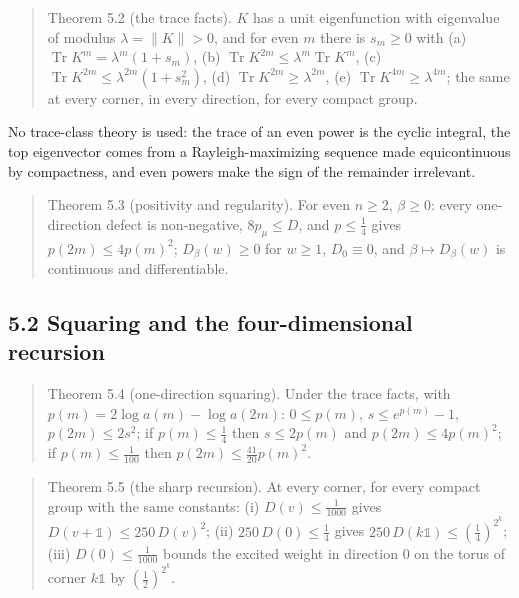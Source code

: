 \documentclass[10pt,letterpaper,twocolumn]{article}
\begin{document}
\begin{quote}
Theorem 5.2 (the trace facts). \(K\) has a unit eigenfunction with eigenvalue of modulus \(\lambda=\|K\|>0\), and for even \(m\) there is \(s_m\ge0\) with (a) \(\operatorname{Tr}K^m=\lambda^m(1+s_m)\), (b) \(\operatorname{Tr}K^{2m}\le\lambda^m\operatorname{Tr}K^m\), (c) \(\operatorname{Tr}K^{2m}\le\lambda^{2m}(1+s_m^2)\), (d) \(\operatorname{Tr}K^{2m}\ge\lambda^{2m}\), (e) \(\operatorname{Tr}K^{4m}\ge\lambda^{4m}\); the same at every corner, in every direction, for every compact group.
\end{quote}

No trace-class theory is used: the trace of an even power is the cyclic integral, the top eigenvector comes from a Rayleigh-maximizing sequence made equicontinuous by compactness, and even powers make the sign of the remainder irrelevant.

\begin{quote}
Theorem 5.3 (positivity and regularity). For even \(n\ge2\), \(\beta\ge0\): every one-direction defect is non-negative, \(8p_\mu\le D\), and \(p\le\tfrac14\) gives \(p(2m)\le4p(m)^2\); \(D_\beta(w)\ge0\) for \(w\ge1\), \(D_0\equiv0\), and \(\beta\mapsto D_\beta(w)\) is continuous and differentiable.
\end{quote}

\subsection{5.2 Squaring and the four-dimensional recursion}\label{52-squaring-and-the-four-dimensional-recursion}

\begin{quote}
Theorem 5.4 (one-direction squaring). Under the trace facts, with \(p(m)=2\log a(m)-\log a(2m)\): \(0\le p(m)\), \(s\le e^{p(m)}-1\), \(p(2m)\le2s^2\); if \(p(m)\le\tfrac14\) then \(s\le2p(m)\) and \(p(2m)\le4p(m)^2\); if \(p(m)\le\tfrac1{100}\) then \(p(2m)\le\tfrac{41}{20}p(m)^2\).
\end{quote}

\begin{quote}
Theorem 5.5 (the sharp recursion). At every corner, for every compact group with the same constants: (i) \(D(v)\le\tfrac1{1000}\) gives \(D(v+\mathbb 1)\le250\,D(v)^2\); (ii) \(250\,D(0)\le\tfrac14\) gives \(250\,D(k\mathbb 1)\le(\tfrac14)^{2^k}\); (iii) \(D(0)\le\tfrac1{1000}\) bounds the excited weight in direction \(0\) on the torus of corner \(k\mathbb 1\) by \((\tfrac12)^{2^k}\).
\end{quote}
\end{document}

